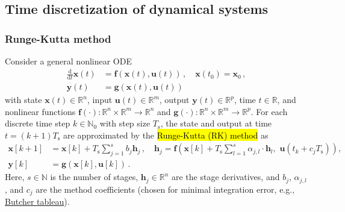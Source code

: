 \subsection{Time discretization of dynamical systems}

\begin{frame}
    \frametitle{Runge-Kutta method}
    Consider a general nonlinear ODE
    \begin{equation}\label{eq:system_det_dyn}
        \begin{split}
            \frac{\mathrm{d}}{\mathrm{d}t}\bm{x}(t) & = \bm{f}(\bm{x}(t), \bm{u}(t))\, , \quad \bm{x}(t_0)=\bm{x}_0\, , \\
            \bm{y}(t)                               & =\bm{g}\left(\bm{x}(t),\bm{u}(t)\right)
        \end{split}
    \end{equation}
    with state $\bm{x}(t)\in \mathbb{R}^n$, input $\bm{u}(t)\in \mathbb{R}^m$, output $\bm{y}(t)\in \mathbb{R}^p$, time $t\in \mathbb{R}$, and nonlinear functions $\bm{f}(\cdot): \mathbb{R}^n \times \mathbb{R}^m  \to \mathbb{R}^n$ and $\bm{g}(\cdot): \mathbb{R}^n \times \mathbb{R}^m  \to \mathbb{R}^p$. \pause For each discrete time step $k\in \mathbb{N}_0$ with step size $T_\mathrm{s}$, the state and output at time $t=(k+1)T_\mathrm{s}$ are approximated by the \hl{ Runge-Kutta (RK) method} as
    \begin{equation}
        \begin{split}
            \bm{x}[k+1] & = \bm{x}[k] + T_\mathrm{s}\sum_{j=1}^{s}b_j\bm{h}_j\, , \quad \bm{h}_j  = \bm{f}\left(\bm{x}[k]+T_\mathrm{s} \sum_{l=1}^{s}\alpha_{j,l}\cdot\bm{h}_l, \,\,\bm{u}(t_k+c_j T_\mathrm{s})\right), \\
            \bm{y}[k]   & = \bm{g}\left(\bm{x}[k],\bm{u}[k]\right)\,.
        \end{split}
        \label{eq:system_det_dyn_RK_explizit}
    \end{equation}\pause
    Here, $s\in \mathbb{N}$ is the number of stages, $\bm{h}_j\in \mathbb{R}^n$ are the stage derivatives, and $b_j$, $\alpha_{j,l}$, and $c_j$ are the method coefficients (chosen for minimal integration error, e.g., \href{https://en.wikipedia.org/wiki/Butcher_tableau}{Butcher tableau}).
\end{frame}


